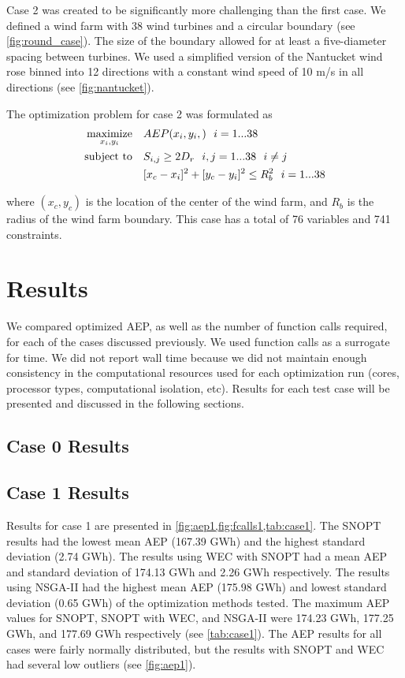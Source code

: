 \documentclass[a4paper]{jpconf}
\begin{document}
  Case 2 was created to be significantly more challenging than the first case. We defined a wind farm with 38 wind turbines and a circular boundary (see \cref{fig:round_case}). The size of the boundary allowed for at least a five-diameter spacing between turbines. We used a simplified version of the Nantucket wind rose binned into 12 directions with a constant wind speed of 10 m/s in all directions (see \cref{fig:nantucket}).


The optimization problem for case 2 was formulated as
%
\begin{equation}
	\label{e:objective}
	\begin{aligned} [b]
	\underset{x_i,y_i}{\textrm{maximize}} \quad & AEP(x_i,y_i,)~~i=1...38\\
	\textrm{subject to} \quad & S_{i,j} \geq 2\*D_{r}~~i,j=1...38~~i \neq j\\
	 & [x_c-x_i]^2+[y_c-y_i]^2 \leq R_{b}^2~~i=1...38\\
	\end{aligned}
\end{equation}
%
where $(x_c,y_c)$ is the location of the center of the wind farm, and $R_b$ is the radius of the wind farm boundary. This case has a total of 76 variables and 741 constraints.

\section{Results}\label{sec:results}
We compared optimized AEP, as well as the number of function calls required, for each of the cases discussed previously. We used function calls as a surrogate for time. We did not report wall time because we did not maintain enough consistency in the computational resources used for each optimization run (cores, processor types, computational isolation, etc). Results for each test case will be presented and discussed in the following sections.

\subsection{Case 0 Results}

\subsection{Case 1 Results}
Results for case 1 are presented in \cref{fig:aep1,fig:fcalls1,tab:case1}. The SNOPT results had the lowest mean AEP (167.39 GWh) and the highest standard deviation (2.74 GWh). The results using WEC with SNOPT had a mean AEP and standard deviation of 174.13 GWh and 2.26 GWh respectively. The results using NSGA-II had the highest mean AEP (175.98 GWh) and lowest standard deviation (0.65 GWh) of the optimization methods tested. The maximum AEP values for SNOPT, SNOPT with WEC, and NSGA-II were 174.23 GWh, 177.25 GWh, and 177.69 GWh respectively (see \cref{tab:case1}). The AEP results for all cases were fairly normally distributed, but the results with SNOPT and WEC had several low outliers (see \cref{fig:aep1}).
\end{document}
